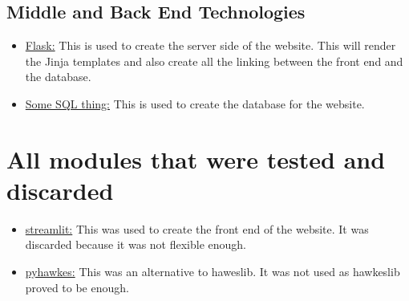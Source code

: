 \documentclass{article}
\begin{document}
\subsection{Middle and Back End Technologies}
\begin{itemize}
\item \underline{Flask:} This is used to create the server side of the website. This will render the Jinja templates and also create all the linking between the front end and the database.
\item \underline{Some SQL thing:} This is used to create the database for the website.
\end{itemize}
\section{All modules that were tested and discarded}
\begin{itemize}
\item \underline{streamlit:} This was used to create the front end of the website. It was discarded because it was not flexible enough.
\item \underline{pyhawkes:} This was an alternative to haweslib. It was not used as hawkeslib proved to be enough.
\end{itemize}
\end{document}

